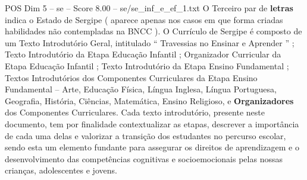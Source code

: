 \begin{textsample}{POS Dim 5 – se – Score 8.00 – se/se\_inf\_e\_ef\_1.txt}
O Terceiro par de \textbf{letras} indica o Estado de Sergipe ( aparece apenas nos casos em que forma criadas habilidades não contempladas na BNCC ).
O Currículo de Sergipe é composto de um Texto Introdutório Geral, intitulado “ Travessias no Ensinar e Aprender ” ; Texto Introdutório da Etapa Educação Infantil ; Organizador Curricular da Etapa Educação Infantil ; Texto Introdutório da Etapa Ensino Fundamental ; Textos Introdutórios dos Componentes Curriculares da Etapa Ensino Fundamental – Arte, Educação Física, Língua Inglesa, Língua Portuguesa, Geografia, História, Ciências, Matemática, Ensino Religioso, e \textbf{Organizadores} dos Componentes Curriculares.
Cada texto introdutório, presente neste documento, tem por finalidade contextualizar as etapas, descrever a importância de cada uma delas e valorizar a transição dos estudantes no percurso escolar, sendo esta um elemento fundante para assegurar os direitos de aprendizagem e o desenvolvimento das competências cognitivas e socioemocionais pelas nossas crianças, adolescentes e jovens.

\end{textsample}
